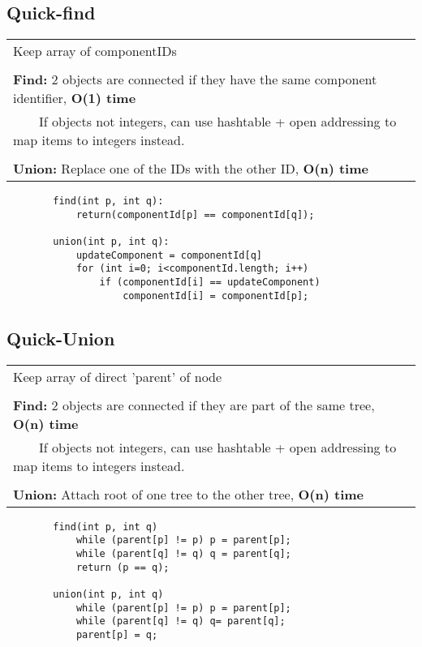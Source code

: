 \documentclass{article}
\newcommand{\tabitem}{~~\llap{\textbullet}~~}
\begin{document}
    \subsection{Quick-find}
    \begin{tabular}{l}
        Keep array of componentIDs\\\\
        \textbf{Find:} 2 objects are connected if they have the same component identifier, \textbf{O(1) time}\\
        \tabitem If objects not integers, can use hashtable + open addressing to map items to integers instead.\\\\
        \textbf{Union:} Replace one of the IDs with the other ID, \textbf{O(n) time}\\
    \end{tabular}

    \begin{verbatim}
        find(int p, int q):
            return(componentId[p] == componentId[q]);

        union(int p, int q):
            updateComponent = componentId[q]
            for (int i=0; i<componentId.length; i++)
                if (componentId[i] == updateComponent)
                    componentId[i] = componentId[p];
    \end{verbatim}

    \subsection{Quick-Union}

    \begin{tabular}{l}
        Keep array of direct 'parent' of node\\\\
        \textbf{Find:} 2 objects are connected if they are part of the same tree, \textbf{O(n) time}\\
        \tabitem If objects not integers, can use hashtable + open addressing to map items to integers instead.\\\\
        \textbf{Union:} Attach root of one tree to the other tree, \textbf{O(n) time}\\
    \end{tabular}

    \begin{verbatim}
        find(int p, int q)
            while (parent[p] != p) p = parent[p];
            while (parent[q] != q) q = parent[q];
            return (p == q);

        union(int p, int q)
            while (parent[p] != p) p = parent[p];
            while (parent[q] != q) q= parent[q];
            parent[p] = q;
    \end{verbatim}
\end{document}
